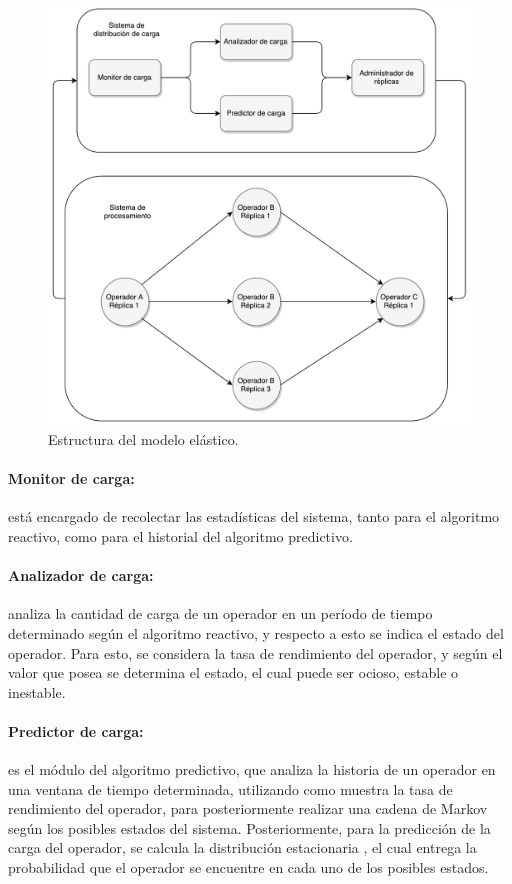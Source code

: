 \begin{figure}[ht!]
  \centering
    \includegraphics[scale=0.5]{images/Diagrama.pdf}
  \caption{Estructura del modelo elástico.}
  \label{fig:componentesSistemas}
\end{figure}

\paragraph{Monitor de carga:} está encargado de recolectar las estadísticas del sistema, tanto para el algoritmo reactivo, como para el historial del algoritmo predictivo.

\paragraph{Analizador de carga:} analiza la cantidad de carga de un operador en un período de tiempo determinado según el algoritmo reactivo, y respecto a esto se indica el estado del operador. Para esto, se considera la tasa de rendimiento del operador, y según el valor que posea se determina el estado, el cual puede ser ocioso, estable o inestable.

\paragraph{Predictor de carga:} es el módulo del algoritmo predictivo, que analiza la historia de un operador en una ventana de tiempo determinada, utilizando como muestra la tasa de rendimiento del operador, para posteriormente realizar una cadena de Markov según los posibles estados del sistema. Posteriormente, para la predicción de la carga del operador, se calcula la distribución estacionaria \citep{Papoulis1984}, el cual entrega la probabilidad que el operador se encuentre en cada uno de los posibles estados.

